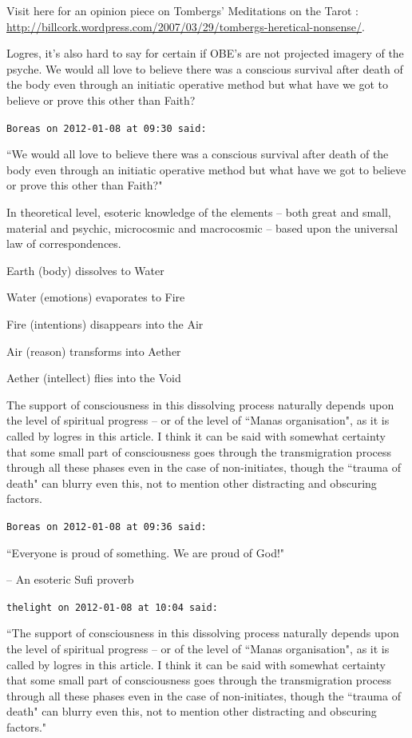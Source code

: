 \begin{footnotesize}
\begin{sffamily}
Visit here for an opinion piece on Tombergs' Meditations on the Tarot : \url{http://billcork.wordpress.com/2007/03/29/tombergs-heretical-nonsense/}.

Logres, it's also hard to say for certain if OBE's are not projected imagery of the psyche. We would all love to believe there was a conscious survival after death of the body even through an initiatic operative method but what have we got to believe or prove this other than Faith?


\hfill

\texttt{Boreas on 2012-01-08 at 09:30 said: }

``We would all love to believe there was a conscious survival after death of the body even through an initiatic operative method but what have we got to believe or prove this other than Faith?"

In theoretical level, esoteric knowledge of the elements – both great and small, material and psychic, microcosmic and macrocosmic – based upon the universal law of correspondences.

Earth (body) dissolves to Water

Water (emotions) evaporates to Fire

Fire (intentions) disappears into the Air

Air (reason) transforms into Aether

Aether (intellect) flies into the Void

The support of consciousness in this dissolving process naturally depends upon the level of spiritual progress – or of the level of ``Manas organisation", as it is called by logres in this article. I think it can be said with somewhat certainty that some small part of consciousness goes through the transmigration process through all these phases even in the case of non-initiates, though the ``trauma of death" can blurry even this, not to mention other distracting and obscuring factors.


\hfill

\texttt{Boreas on 2012-01-08 at 09:36 said: }

``Everyone is proud of something. We are proud of God!"

– An esoteric Sufi proverb


\hfill

\texttt{thelight on 2012-01-08 at 10:04 said: }

``The support of consciousness in this dissolving process naturally depends upon the level of spiritual progress – or of the level of ``Manas organisation", as it is called by logres in this article. I think it can be said with somewhat certainty that some small part of consciousness goes through the transmigration process through all these phases even in the case of non-initiates, though the ``trauma of death" can blurry even this, not to mention other distracting and obscuring factors."


\end{sffamily}
\end{footnotesize}
